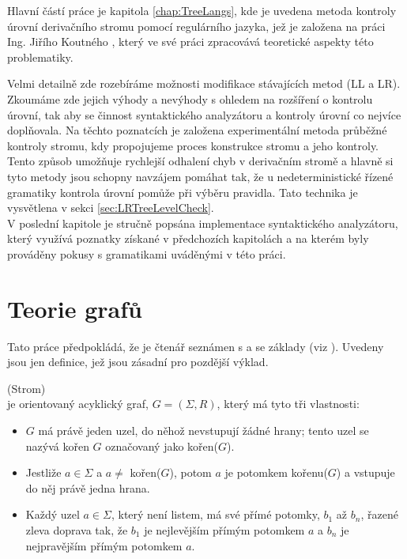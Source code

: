 Hlavní částí práce je kapitola \ref{chap:TreeLangs}, kde je uvedena metoda kontroly
úrovní derivačního stromu pomocí regulárního jazyka, jež je založena na práci
Ing. Jiřího Koutného \cite{Koutny}, který ve své práci zpracovává teoretické
aspekty této problematiky.

Velmi detailně zde rozebíráme možnosti modifikace stávajících metod (LL a LR).
Zkoumáme zde jejich výhody a nevýhody s ohledem na
rozšíření o kontrolu úrovní, tak aby se činnost syntaktického
analyzátoru a kontroly úrovní co nejvíce doplňovala. Na těchto poznatcích je
založena experimentální metoda průběžné kontroly stromu, kdy propojujeme proces
konstrukce stromu a jeho kontroly. Tento způsob umožňuje rychlejší odhalení
chyb v derivačním stromě a hlavně si tyto metody jsou schopny navzájem pomáhat
tak, že u nedeterministické řízené gramatiky kontrola úrovní pomůže
při výběru pravidla. Tato technika je vysvětlena v sekci
\ref{sec:LRTreeLevelCheck}.\\

V poslední kapitole je stručně popsána implementace syntaktického analyzátoru,
který využívá poznatky získané v předchozích kapitolách a na kterém byly
prováděny pokusy s gramatikami uváděnými v této práci.


\chapter{Teorie grafů}
\label{chap:Definitions}

Tato práce předpokládá, že je čtenář seznámen s  a
se základy  (viz \cite{MedunaIFJ}).
Uvedeny jsou jen definice, jež jsou zásadní pro pozdější výklad.

\begin{defn}
  (Strom)\\
   je orientovaný acyklický graf, $G = (\Sigma, R)$, který má tyto
  tři vlastnosti:
  \begin{itemize}
    \item   $G$ má právě jeden uzel, do něhož nevstupují žádné hrany;
      tento uzel se nazývá kořen $G$ označovaný jako kořen($G$).
    \item Jestliže $a \in \Sigma$ a $a \neq$ kořen($G$), potom $a$ je
    potomkem kořenu($G$) a vstupuje do něj právě jedna hrana.
    \item   Každý uzel $a \in \Sigma$, který není listem, má své přímé potomky,
      $b_1$ až $b_n$, řazené zleva doprava tak, že $b_1$ je
      nejlevějším přímým potomkem $a$ a $b_n$ je nejpravějším přímým
      potomkem $a$.
  \end{itemize}
  \vspace{-0.5cm}
\end{defn}

